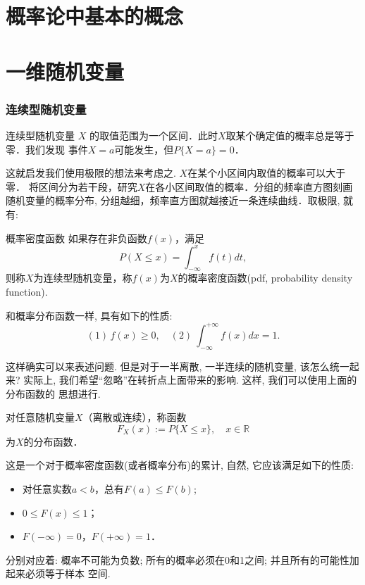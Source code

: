 
\usepackage{ctex}
\usepackage{pifont}



% 

\part{概率论中基本的概念}





\part{一维随机变量}



\section{连续型随机变量}
连续型随机变量 $X$ 的取值范围为一个区间．此时$X$取某个确定值的概率总是等于零．我们发现
事件$X=a$可能发生，但$P\{X=a\}=0$．

这就启发我们使用极限的想法来考虑之. $X$在某个小区间内取值的概率可以大于零．
将区间分为若干段，研究$X$在各小区间取值的概率．分组的频率直方图刻画随机变量的概率分布, 
分组越细，频率直方图就越接近一条连续曲线．取极限, 就有: 

\begin{definition}{概率密度函数}
    如果存在非负函数$f(x)$，满足
    $$
    P(X\leq x)=\int_{-\infty}^{x}f(t)dt,
    $$
    则称$X$为连续型随机变量，称$f(x)$为$X$的概率密度函数(pdf, probability density function).
    \end{definition}

    和概率分布函数一样, 具有如下的性质: 
    $$
(1)\,f(x)\ge 0,\quad (2)\ \int_{-\infty}^{+\infty}f(x)dx=1.
$$

这样确实可以来表述问题. 但是对于一半离散, 一半连续的随机变量, 该怎么统一起来? 
实际上, 我们希望``忽略''在转折点上面带来的影响. 这样, 我们可以使用上面的分布函数的
思想进行. 

\begin{definition}
    对任意随机变量$X$（离散或连续），称函数
    $$F_X(x):=P\{X\le x\},\quad x\in \mathbb{R}$$
    为$X$的分布函数．
    \end{definition}    
    这是一个对于概率密度函数(或者概率分布)的累计, 自然, 它应该满足如下的性质: 

    \begin{itemize}
        \item 对任意实数$a<b$，总有$F(a)\le F(b)$;
        \item $0 \le F(x) \le 1$；
        \item $F(-\infty)=0$，$F(+\infty)=1$．
      \end{itemize}
      分别对应着: 概率不可能为负数; 所有的概率必须在0和1之间; 并且所有的可能性加起来必须等于样本
      空间. 

